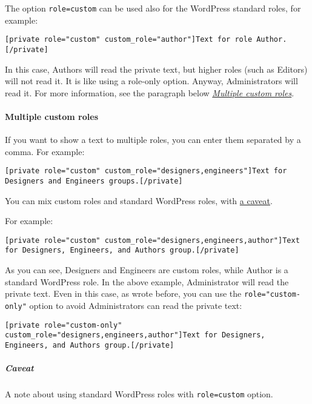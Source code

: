 \documentclass[a4paper,10pt]{article}
\begin{document}
The option \verb+role=custom+ can be used also for the WordPress standard roles, for example:

\begin{lstlisting}
[private role="custom" custom_role="author"]Text for role Author.[/private]
\end{lstlisting}

In this case, Authors will read the private text, but higher roles (such as Editors) will not read it. It is like using a role-only option. Anyway, Administrators will read it. For more information, see the paragraph below \textit{\hyperref[multiple-custom-roles]{Multiple custom roles}}.

\paragraph{Multiple custom roles}\label{multiple-custom-roles}

If you want to show a text to multiple roles, you can enter them separated by a comma. For example:

\begin{lstlisting}
[private role="custom" custom_role="designers,engineers"]Text for Designers and Engineers groups.[/private]
\end{lstlisting}

You can mix custom roles and standard WordPress roles, with \hyperref[caveat]{a caveat}.

For example:

\begin{lstlisting}
[private role="custom" custom_role="designers,engineers,author"]Text for Designers, Engineers, and Authors group.[/private]
\end{lstlisting}

As you can see, Designers and Engineers are custom roles, while Author is a standard WordPress role. In the above example, Administrator will read the private text. Even in this case, as wrote before, you can use the \verb+role="custom-only"+ option to avoid Administrators can read the private text:

\begin{lstlisting}
[private role="custom-only" custom_role="designers,engineers,author"]Text for Designers, Engineers, and Authors group.[/private]
\end{lstlisting}

\subparagraph{Caveat} \label{caveat}

A note about using standard WordPress roles with \verb+role=custom+ option.
\end{document}
